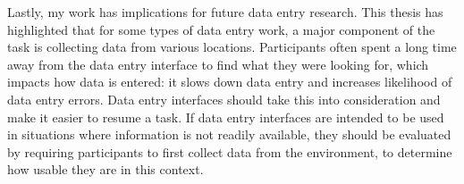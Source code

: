 Lastly, my work has implications for future data entry research. This thesis has highlighted that for some types of data entry work, a major component of the task is collecting data from various locations. Participants often spent a long time away from the data entry interface to find what they were looking for, which impacts how data is entered: it slows down data entry and increases likelihood of data entry errors. Data entry interfaces should take this into consideration and make it easier to resume a task. If data entry interfaces are intended to be used in situations where information is not readily available, they should be evaluated by requiring participants to first collect data from the environment, to determine how usable they are in this context. 



